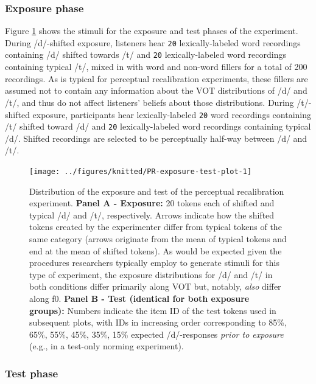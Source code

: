 \documentclass[
  11pt,
  man,floatsintext]{apa6}
\begin{document}
\hypertarget{exposure-phase}{%
\subsubsection{Exposure phase}\label{exposure-phase}}

Figure \ref{fig:PR-exposure-test-plot} shows the stimuli for the exposure and test phases of the experiment. During /d/-shifted exposure, listeners hear \texttt{20} lexically-labeled word recordings containing /d/ shifted towards /t/ and \texttt{20} lexically-labeled word recordings containing typical /t/, mixed in with word and non-word fillers for a total of 200 recordings. As is typical for perceptual recalibration experiments, these fillers are assumed not to contain any information about the VOT distributions of /d/ and /t/, and thus do not affect listeners' beliefs about those distributions. During /t/-shifted exposure, participants hear lexically-labeled \texttt{20} word recordings containing /t/ shifted toward /d/ and \texttt{20} lexically-labeled word recordings containing typical /d/. Shifted recordings are selected to be perceptually half-way between /d/ and /t/.



\begin{figure}

{\centering \texttt{[image: ../figures/knitted/PR-exposure-test-plot-1]} 

}

\caption{Distribution of the exposure and test of the perceptual recalibration experiment. \textbf{Panel A - Exposure:} 20 tokens each of shifted and typical /d/ and /t/, respectively. Arrows indicate how the shifted tokens created by the experimenter differ from typical tokens of the same category (arrows originate from the mean of typical tokens and end at the mean of shifted tokens). As would be expected given the procedures researchers typically employ to generate stimuli for this type of experiment, the exposure distributions for /d/ and /t/ in both conditions differ primarily along VOT but, notably, \emph{also} differ along f0. \textbf{Panel B - Test (identical for both exposure groups):} Numbers indicate the item ID of the test tokens used in subsequent plots, with IDs in increasing order corresponding to 85\%, 65\%, 55\%, 45\%, 35\%, 15\% expected /d/-responses \emph{prior to exposure} (e.g., in a test-only norming experiment).}\label{fig:PR-exposure-test-plot}
\end{figure}

\hypertarget{test-phase}{%
\subsubsection{Test phase}\label{test-phase}}
\end{document}
